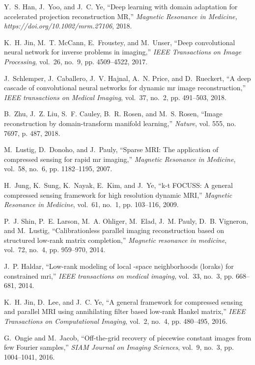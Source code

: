 \documentclass[10pt,journal]{IEEEtran}
\newcommand{\0}{{\boldsymbol{0}}}
\begin{document}
\begin{thebibliography}{10}
Y.~S. Han, J.~Yoo, and J.~C. Ye, ``Deep learning with domain adaptation for
  accelerated projection reconstruction {MR},'' \emph{Magnetic Resonance in
  Medicine, https://doi.org/10.1002/mrm.27106}, 2018.

K.~H. Jin, M.~T. McCann, E.~Froustey, and M.~Unser, ``Deep convolutional neural
  network for inverse problems in imaging,'' \emph{IEEE Transactions on Image
  Processing}, vol.~26, no.~9, pp. 4509--4522, 2017.

J.~Schlemper, J.~Caballero, J.~V. Hajnal, A.~N. Price, and D.~Rueckert, ``A
  deep cascade of convolutional neural networks for dynamic mr image
  reconstruction,'' \emph{IEEE transactions on Medical Imaging}, vol.~37,
  no.~2, pp. 491--503, 2018.

B.~Zhu, J.~Z. Liu, S.~F. Cauley, B.~R. Rosen, and M.~S. Rosen, ``Image
  reconstruction by domain-transform manifold learning,'' \emph{Nature}, vol.
  555, no. 7697, p. 487, 2018.

M.~Lustig, D.~Donoho, and J.~Pauly, ``Sparse {MRI}: The application of
  compressed sensing for rapid mr imaging,'' \emph{Magnetic Resonance in
  Medicine}, vol.~58, no.~6, pp. 1182--1195, 2007.

H.~Jung, K.~Sung, K.~Nayak, E.~Kim, and J.~Ye, ``k-t {FOCUSS}: A general
  compressed sensing framework for high resolution dynamic {MRI},''
  \emph{Magnetic Resonance in Medicine}, vol.~61, no.~1, pp. 103--116, 2009.

P.~J. Shin, P.~E. Larson, M.~A. Ohliger, M.~Elad, J.~M. Pauly, D.~B. Vigneron,
  and M.~Lustig, ``Calibrationless parallel imaging reconstruction based on
  structured low-rank matrix completion,'' \emph{Magnetic resonance in
  medicine}, vol.~72, no.~4, pp. 959--970, 2014.

J.~P. Haldar, ``Low-rank modeling of local -space neighborhoods (loraks)
  for constrained mri,'' \emph{IEEE transactions on medical imaging}, vol.~33,
  no.~3, pp. 668--681, 2014.

K.~H. Jin, D.~Lee, and J.~C. Ye, ``A general framework for compressed sensing
  and parallel {MRI} using annihilating filter based low-rank {H}ankel
  matrix,'' \emph{IEEE Transactions on Computational Imaging}, vol.~2, no.~4,
  pp. 480--495, 2016.

G.~Ongie and M.~Jacob, ``Off-the-grid recovery of piecewise constant images
  from few {F}ourier samples,'' \emph{SIAM Journal on Imaging Sciences},
  vol.~9, no.~3, pp. 1004--1041, 2016.


\end{thebibliography}
\end{document}

